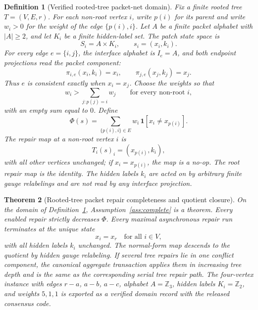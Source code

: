 \documentclass[11pt]{article}
\newtheorem{theorem}{Theorem}[section]
\newtheorem{definition}[theorem]{Definition}
\theoremstyle{remark}
\theoremstyle{plain}
\begin{document}
\begin{definition}[Verified rooted-tree packet-net domain]\label{def:tree-packet-domain}
Fix a finite rooted tree \(T=(V,E,r)\). For each non-root vertex \(i\), write \(p(i)\) for its
parent and write \(w_i>0\) for the weight of the edge \(\{p(i),i\}\). Let \(A\) be a finite
packet alphabet with \(|A|\ge2\), and let \(K_i\) be a finite hidden-label set. The patch state
space is
\[
S_i=A\times K_i,
\qquad
s_i=(x_i,k_i).
\]
For every edge \(e=\{i,j\}\), the interface alphabet is \(I_e=A\), and both endpoint projections
read the packet component:
\[
\pi_{i,e}(x_i,k_i)=x_i,
\qquad
\pi_{j,e}(x_j,k_j)=x_j.
\]
Thus \(e\) is consistent exactly when \(x_i=x_j\). Choose the weights so that
\[
w_i>\sum_{j:p(j)=i}w_j
\qquad
\text{for every non-root } i,
\]
with an empty sum equal to \(0\). Define
\[
\Phi(s)=\sum_{\{p(i),i\}\in E}w_i\,\mathbf 1[x_i\ne x_{p(i)}].
\]
The repair map at a non-root vertex \(i\) is
\[
T_i(s)_i=(x_{p(i)},k_i),
\]
with all other vertices unchanged; if \(x_i=x_{p(i)}\), the map is a no-op. The root repair map is
the identity. The hidden labels \(k_i\) are acted on by arbitrary finite gauge relabelings and are
not read by any interface projection.
\end{definition}

\begin{theorem}[Rooted-tree packet repair completeness and quotient closure]\label{thm:tree-packet-domain}
On the domain of Definition~\ref{def:tree-packet-domain}, Assumption~\ref{ass:complete} is a
theorem. Every enabled repair strictly decreases \(\Phi\). Every maximal asynchronous repair run
terminates at the unique state
\[
x_i=x_r\quad\text{for all }i\in V,
\]
with all hidden labels \(k_i\) unchanged. The normal-form map descends to the quotient by hidden
gauge relabeling. If several tree repairs lie in one conflict component, the canonical aggregate
transaction applies them in increasing tree depth and is the same as the corresponding serial
tree repair path. The four-vertex instance with edges \(r\!-\!a\), \(a\!-\!b\), \(a\!-\!c\),
alphabet \(A=\mathbb Z_3\), hidden labels \(K_i=\mathbb Z_2\), and weights \(5,1,1\) is exported
as a verified domain record with the released consensus code.
\end{theorem}
\end{document}
